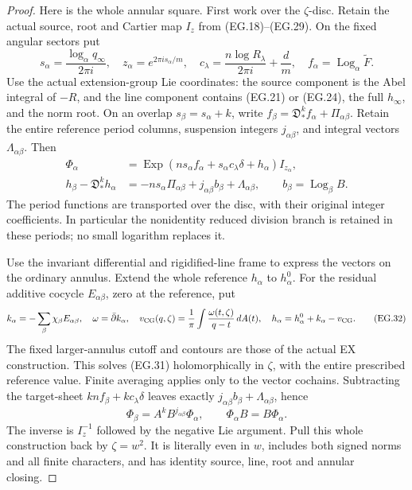 \begin{proof}
Here is the whole annular square. First work over the
\(\zeta\)-disc. Retain the actual source, root and Cartier map
\(I_z\) from (EG.18)--(EG.29). On the fixed angular sectors put
\[
 s_\alpha=\frac{\log_\alpha q_\infty}{2\pi i},\quad
 z_\alpha=e^{2\pi i s_\alpha/m},\quad
 c_\lambda=\frac{n\log R_\lambda}{2\pi i}+\frac dm,\quad
 f_\alpha=\operatorname{Log}_\alpha\widetilde F .
 \tag{EG.30}
\]
Use the actual extension-group Lie coordinates: the
source component is the Abel integral of \(-R\), and
the line component contains (EG.21) or (EG.24), the
full \(h_\infty\), and the norm root. On an overlap
\(s_\beta=s_\alpha+k\), write
\(f_\beta=\mathfrak D_*^k f_\alpha+\Pi_{\alpha\beta}\).
Retain the entire reference period columns, suspension
integers \(j_{\alpha\beta}\), and integral vectors
\(\Lambda_{\alpha\beta}\). Then
\[
 \begin{split}
 \Phi_\alpha&=\operatorname{Exp}
     (n s_\alpha f_\alpha+s_\alpha c_\lambda\delta
                              +h_\alpha)I_{z_\alpha},\\
 h_\beta-\mathfrak D_*^k h_\alpha
   &=-n s_\alpha\Pi_{\alpha\beta}
              +j_{\alpha\beta}b_\beta+\Lambda_{\alpha\beta},
 \qquad b_\beta=\operatorname{Log}_\beta B .
 \end{split}
 \tag{EG.31}
\]
The period functions are transported over the disc,
with their original integer coefficients. In particular
the nonidentity reduced division branch is retained in
these periods; no small logarithm replaces it.

Use the invariant differential and rigidified-line
frame to express the vectors on the ordinary annulus.
Extend the whole reference \(h_\alpha\) to \(h_\alpha^0\).
For the residual additive cocycle \(E_{\alpha\beta}\),
zero at the reference, put
\[
 k_\alpha=-\sum_\beta\chi_\beta E_{\alpha\beta},\quad
 \omega=\bar\partial k_\alpha,\quad
 v_{\rm CG}(q,\zeta)=\frac1\pi\int
                   \frac{\omega(t,\zeta)}{q-t}\,dA(t),\quad
 h_\alpha=h_\alpha^0+k_\alpha-v_{\rm CG}.
 \tag{EG.32}
\]
The fixed larger-annulus cutoff and contours are those
of the actual EX construction. This solves (EG.31)
holomorphically in \(\zeta\), with the entire prescribed
reference value. Finite averaging applies only to the
vector cochains. Subtracting the target-sheet
\(knf_\beta+kc_\lambda\delta\) leaves exactly
\(j_{\alpha\beta}b_\beta+\Lambda_{\alpha\beta}\), hence
\[
 \Phi_\beta=A^k B^{j_{\alpha\beta}}\Phi_\alpha,\qquad
 \Phi_\alpha B=B\Phi_\alpha .
 \tag{EG.33}
\]
The inverse is \(I_z^{-1}\) followed by the negative
Lie argument. Pull this whole construction back by
\(\zeta=w^2\). It is literally even in \(w\), includes
both signed norms and all finite characters, and has
identity source, line, root and annular closing.


\end{proof}

